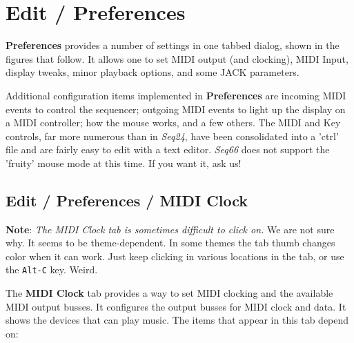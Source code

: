 %
%
%

\section{Edit / Preferences}
\label{sec:edit_preferences}

   \textbf{Preferences} provides a number of settings in one
   tabbed dialog, shown in the figures that follow.
   It allows one to set MIDI output (and clocking),
   MIDI Input, display tweaks, minor
   playback options, and some JACK parameters.

   Additional configuration items implemented in \textbf{Preferences} are
   incoming MIDI events to control the sequencer;
   outgoing MIDI events to light up the display on a MIDI controller;
   how the mouse works, and a few others.
   The MIDI and Key controls, far more numerous than in \textsl{Seq24}, have
   been consolidated into a 'ctrl' file and are fairly easy to edit with a text
   editor.
   \textsl{Seq66} does not support the 'fruity' mouse mode at this time.
   If you want it, ask us!

\subsection{Edit / Preferences / MIDI Clock}
\label{subsection:edit_preferences_midi_clock}

   \textbf{Note}:
   \textsl{The MIDI Clock tab is sometimes difficult to click on.}
   We are not sure why.  It seems to be theme-dependent.
   In some themes the tab thumb changes color when it can work.
   Just keep clicking in various locations in the tab,
   or use the \texttt{Alt-C} key.
   Weird.

   The \textbf{MIDI Clock} tab provides a way to set MIDI clocking and
   the available MIDI output busses.
   It configures the output busses for MIDI clock and data.
   It shows the devices that can play music.
   The items that appear in this tab depend on:

